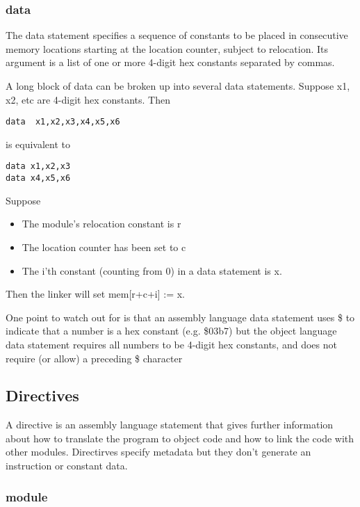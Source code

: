 \documentclass[11pt]{article}
\begin{document}
\subsubsection*{data}
\label{sec:orgaf9e290}

The data statement specifies a sequence of constants to be placed in
consecutive memory locations starting at the location counter, subject
to relocation.  Its argument is a list of one or more 4-digit hex
constants separated by commas.

A long block of data can be broken up into several data statements.
Suppose x1, x2, etc are 4-digit hex constants.  Then

\begin{verbatim}
data  x1,x2,x3,x4,x5,x6
\end{verbatim}

is equivalent to

\begin{verbatim}
data x1,x2,x3
data x4,x5,x6
\end{verbatim}

Suppose

\begin{itemize}
\item The module's relocation constant is r
\item The location counter has been set to c
\item The i'th constant (counting from 0) in a data statement is x.
\end{itemize}

Then the linker will set mem[r+c+i] := x.

One point to watch out for is that an assembly language data statement
uses \$ to indicate that a number is a hex constant (e.g. \$03b7) but
the object language data statement requires all numbers to be 4-digit
hex constants, and does not require (or allow) a preceding \$ character


\subsection*{Directives}
\label{sec:org1af541e}

A directive is an assembly language statement that gives further
information about how to translate the program to object code and how
to link the code with other modules.  Directirves specify metadata but
they don't generate an instruction or constant data.

\subsubsection*{module}
\label{sec:orgb090268}
\end{document}
